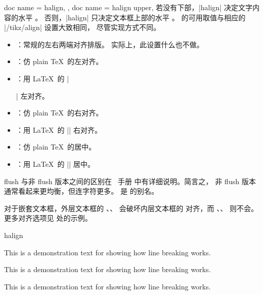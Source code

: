 \begin{docTcbKeys}[
    doc parameter   = {=\meta{alignment}},
    doc description = {无默认值，初始 \texttt{justify}},
    doc new         = 2015-05-07,
  ]
  {
    {
      doc name = halign,
    },
    {
      doc name = halign upper,
    }
  }
  若没有下部，|halign| 决定文字内容的水平 。
  否则，|halign| 只决定文本框上部的水平 。
   的可用取值与相应的 |/tikz/align| 设置大致相同，
  尽管实现方式不同。
  \begin{itemize}
  \item{}：常规的左右两端对齐排版。
    实际上，此设置什么也不做。
  \item{}：仿 plain \TeX\ 的左对齐。
  \item{}：用 \LaTeX\ 的 |\raggedright| 左对齐。
  \item{}：仿 plain \TeX\ 的右对齐。
  \item{}：用 \LaTeX\ 的 |\raggedleft| 右对齐。
  \item{}：仿 plain \TeX\ 的居中。
  \item{}：用 \LaTeX\ 的 |\centering| 居中。
  \end{itemize}
  flush 与非 flush 版本之间的区别在 \tikzname\ 手册
  \cite{tantau:tikz_and_pgf} 中有详细说明。简言之，
  非 flush 版本通常看起来更均衡，但连字符更多。
   是  的别名。

\enlargethispage*{10mm}
\begin{marker}
对于嵌套文本框，外层文本框的 、、
会破坏内层文本框的  对齐，而
、、
则不会。更多对齐选项见  处的示例。
\end{marker}

\begin{exdispExample}{halign}

\begin{tcolorbox}[adjusted title=flush center,halign=flush center]
This is a demonstration text for showing how line breaking works.
\end{tcolorbox}
\begin{tcolorbox}[adjusted title=flush left,halign=flush left]
This is a demonstration text for showing how line breaking works.
\end{tcolorbox}
\begin{tcolorbox}[adjusted title=flush right,halign=flush right]
This is a demonstration text for showing how line breaking works.
\end{tcolorbox}


\end{exdispExample}
\end{docTcbKeys}
